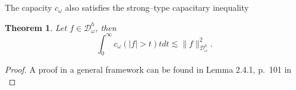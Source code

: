 \documentclass[12pt,reqno,a4paper]{amsart}
\newtheorem{theo}[prop]{Theorem}
\newtheorem{coro}{Corollary}
\newtheorem{exe}[prop]{Example}
\renewcommand{\Re}{\mathrm{Re }}
\newcommand\TT{\mathbb{T}}
\newcommand\NN{\mathbb{N}}
\DeclareMathOperator{\supp}{supp}
\newcommand{\cD}{{\mathcal{D}}}
\numberwithin{equation}{section}
\begin{document}
	
	
	
	The capacity $c_\omega$ also satisfies the strong--type capacitary inequality
	
	\begin{theo}\label{Strong-inequality}
		Let $f\in \cD^h_\omega$, then 
		$$\int_0^{\infty}c_{\omega}(|f|>t)tdt\lesssim \|f\|^2_{\cD_\omega^h}.$$
	\end{theo}
	\begin{proof}
		A proof in a general framework can be found in Lemma 2.4.1, p.~101 in \cite{Fuk} 
	\end{proof}
	
\end{document}
